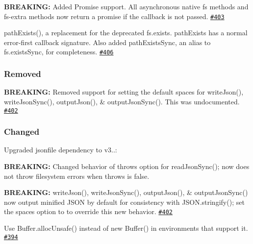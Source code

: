 \begin{DoxyItemize}
\item {\bfseries B\+R\+E\+A\+K\+I\+NG\+:} Added Promise support. All asynchronous native fs methods and fs-\/extra methods now return a promise if the callback is not passed. \href{https://github.com/jprichardson/node-fs-extra/pull/403}{\tt \#403}
\item {\ttfamily path\+Exists()}, a replacement for the deprecated {\ttfamily fs.\+exists}. {\ttfamily path\+Exists} has a normal error-\/first callback signature. Also added {\ttfamily path\+Exists\+Sync}, an alias to {\ttfamily fs.\+exists\+Sync}, for completeness. \href{https://github.com/jprichardson/node-fs-extra/pull/406}{\tt \#406}
\end{DoxyItemize}

\subsubsection*{Removed}


\begin{DoxyItemize}
\item {\bfseries B\+R\+E\+A\+K\+I\+NG\+:} Removed support for setting the default spaces for {\ttfamily write\+Json()}, {\ttfamily write\+Json\+Sync()}, {\ttfamily output\+Json()}, \& {\ttfamily output\+Json\+Sync()}. This was undocumented. \href{https://github.com/jprichardson/node-fs-extra/pull/402}{\tt \#402}
\end{DoxyItemize}

\subsubsection*{Changed}


\begin{DoxyItemize}
\item Upgraded jsonfile dependency to v3..\+:
\begin{DoxyItemize}
\item {\bfseries B\+R\+E\+A\+K\+I\+NG\+:} Changed behavior of {\ttfamily throws} option for {\ttfamily read\+Json\+Sync()}; now does not throw filesystem errors when {\ttfamily throws} is {\ttfamily false}.
\end{DoxyItemize}
\item {\bfseries B\+R\+E\+A\+K\+I\+NG\+:} {\ttfamily write\+Json()}, {\ttfamily write\+Json\+Sync()}, {\ttfamily output\+Json()}, \& {\ttfamily output\+Json\+Sync()} now output minified J\+S\+ON by default for consistency with {\ttfamily J\+S\+O\+N.\+stringify()}; set the {\ttfamily spaces} option to {} to override this new behavior. \href{https://github.com/jprichardson/node-fs-extra/pull/402}{\tt \#402}
\item Use {\ttfamily Buffer.\+alloc\+Unsafe()} instead of {\ttfamily new Buffer()} in environments that support it. \href{https://github.com/jprichardson/node-fs-extra/pull/394}{\tt \#394}
\end{DoxyItemize}

